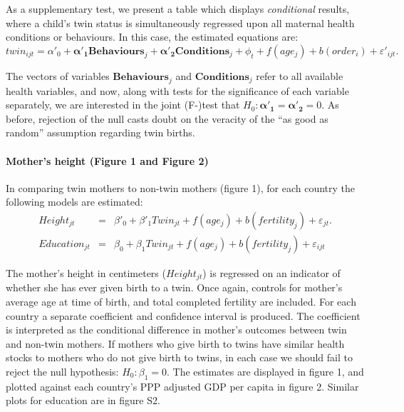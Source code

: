 \documentclass[11pt]{article}
\begin{document}
As a supplementary test, we present a table which displays \emph{conditional} results, where a child's twin status is simultaneously regressed upon all maternal health conditions or behaviours.  In this case, the estimated equations are:
\begin{equation}
  \label{reg:twincond}
  twin_{ijt}=\alpha'_0 + \bm{\alpha'_1} \bm{Behaviours}_j + \bm{\alpha'_2} \bm{Conditions}_j + \phi_t + f(age_j) + b(order_i) + \varepsilon'_{ijt}.
\end{equation}

The vectors of variables $\bm{Behaviours}_j$ and $\bm{Conditions}_j$ refer to all available health variables, and now, along with tests for the significance of each variable separately, we are interested in the joint (F-)test that $H_0:\bm{\alpha'_1}=\bm{\alpha'_2}=0$.  As before, rejection of the null casts doubt on the veracity of the ``as good as random'' assumption regarding twin births.

\paragraph{Mother's height (Figure 1 and Figure 2)}
In comparing twin mothers to non-twin mothers (figure 1), for each country the following models are estimated:
\begin{eqnarray}
  Height_{jt}&=&\beta'_0 + \beta'_1 Twin_{jt} + f(age_j) + b(fertility_j) + \varepsilon_{jt}.\\
  Education_{jt}&=&\beta_0 + \beta_1 Twin_{jt} + f(age_j) + b(fertility_j) + \varepsilon_{ijt}
\end{eqnarray}

The mother's height in centimeters ($Height_{jt}$) is regressed on an indicator of whether she has ever given birth to a twin.  Once again, controls for mother's average age at time of birth, and total completed fertility are included.  For each country a separate coefficient and confidence interval is produced.  The coefficient is interpreted as the conditional difference in mother's outcomes between twin and non-twin mothers.  If mothers who give birth to twins have similar health stocks to mothers who do not give birth to twins, in each case we should fail to reject the null hypothesis: $H_0: \beta_1=0$.  The estimates are displayed in figure 1, and plotted against each country's PPP adjusted GDP per capita in figure 2.  Similar plots for education are in figure S2.
\end{document}
